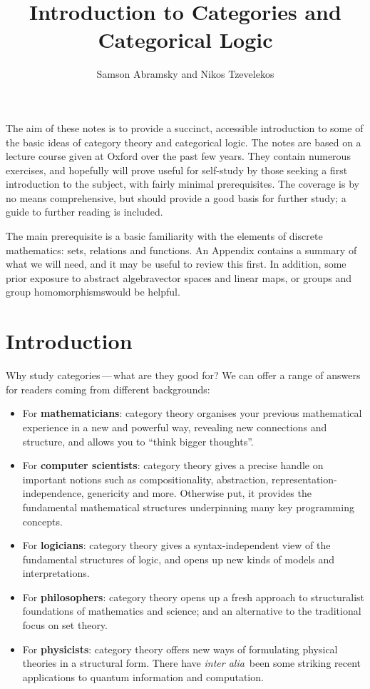 \documentclass{svmult}
\begin{document}
\title{Introduction to Categories and Categorical Logic}
\author{Samson Abramsky and Nikos Tzevelekos}
\maketitle

\preface
The aim of these notes is to provide a succinct, accessible introduction to some of the basic ideas of category theory and categorical logic. The notes are based on a lecture course given at Oxford over the past few years. They contain numerous exercises, and hopefully will prove useful for self-study by those seeking a first introduction to the subject, with fairly minimal prerequisites. The coverage is by no means comprehensive, but should provide a good basis for further study; a  guide to further reading is included.

The main prerequisite is a basic familiarity with the elements of discrete mathematics: sets, relations and functions. An Appendix contains a summary of what we will need, and it may be useful to review this first.
In addition, some prior exposure to abstract algebra\HY vector spaces and linear maps, or groups and group homomorphisms\HY would be helpful.

\setcounter{tocdepth}{2}
\tableofcontents\listoftables


\section{Introduction}
Why study categories\,---\,what are they good for? We can offer a range of answers for readers coming from different backgrounds:
\begin{itemize}
\item For \textbf{mathematicians}: category theory organises your previous mathematical experience in a new and powerful way, revealing new connections and structure,
and allows you to ``think bigger thoughts''.
\item For  \textbf{computer scientists}: category theory gives a precise handle on important notions such as compositionality, abstraction, represen{\-}tation-independence, genericity and more.
Otherwise put, it provides the fundamental mathematical structures underpinning many key programming concepts.
\item For  \textbf{logicians}: category theory gives a syntax-independent view of the fundamental structures of logic, and opens up new kinds of models and interpretations.
\item For  \textbf{philosophers}: category theory opens up a fresh approach to structuralist foundations of mathematics and science; and an alternative to the traditional focus
on set theory.
\item For \textbf{physicists}: category theory offers new ways of formulating physical theories in a structural form. There have \textit{inter alia}~been some striking recent applications to quantum information and
computation.
\end{itemize}
\end{document}
